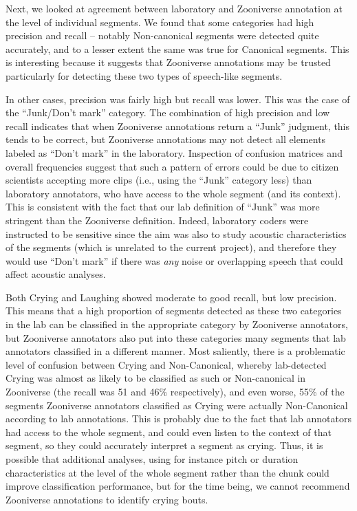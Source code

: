 \documentclass[
  english,
  ,man]{apa6}
\begin{document}
Next, we looked at agreement between laboratory and Zooniverse annotation at the level of individual segments. We found that some categories had high precision and recall -- notably Non-canonical segments were detected quite accurately, and to a lesser extent the same was true for Canonical segments. This is interesting because it suggests that Zooniverse annotations may be trusted particularly for detecting these two types of speech-like segments.

In other cases, precision was fairly high but recall was lower. This was the case of the ``Junk/Don't mark'' category. The combination of high precision and low recall indicates that when Zooniverse annotations return a ``Junk'' judgment, this tends to be correct, but Zooniverse annotations may not detect all elements labeled as ``Don't mark'' in the laboratory. Inspection of confusion matrices and overall frequencies suggest that such a pattern of errors could be due to citizen scientists accepting more clips (i.e., using the ``Junk'' category less) than laboratory annotators, who have access to the whole segment (and its context). This is consistent with the fact that our lab definition of ``Junk'' was more stringent than the Zooniverse definition. Indeed, laboratory coders were instructed to be sensitive since the aim was also to study acoustic characteristics of the segments (which is unrelated to the current project), and therefore they would use ``Don't mark'' if there was \emph{any} noise or overlapping speech that could affect acoustic analyses.

Both Crying and Laughing showed moderate to good recall, but low precision. This means that a high proportion of segments detected as these two categories in the lab can be classified in the appropriate category by Zooniverse annotators, but Zooniverse annotators also put into these categories many segments that lab annotators classified in a different manner. Most saliently, there is a problematic level of confusion between Crying and Non-Canonical, whereby lab-detected Crying was almost as likely to be classified as such or Non-canonical in Zooniverse (the recall was 51 and 46\% respectively), and even worse, 55\% of the segments Zooniverse annotators classified as Crying were actually Non-Canonical according to lab annotations. This is probably due to the fact that lab annotators had access to the whole segment, and could even listen to the context of that segment, so they could accurately interpret a segment as crying. Thus, it is possible that additional analyses, using for instance pitch or duration characteristics at the level of the whole segment rather than the chunk could improve classification performance, but for the time being, we cannot recommend Zooniverse annotations to identify crying bouts.
\end{document}
